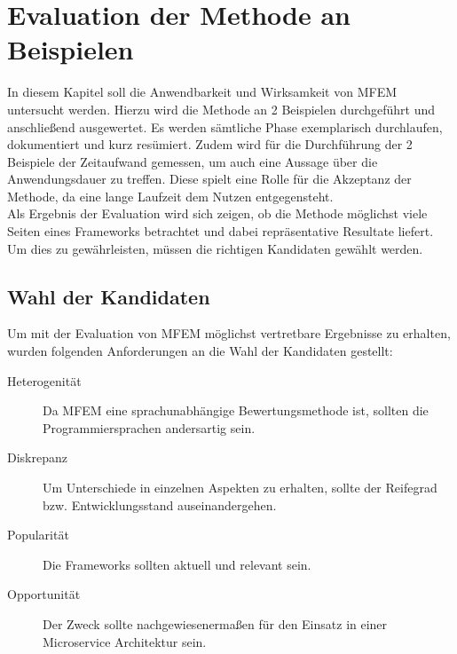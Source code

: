 \section{Evaluation der Methode an Beispielen}

In diesem Kapitel soll die Anwendbarkeit und Wirksamkeit von \ac{MFEM} untersucht werden. Hierzu wird die Methode an 2 Beispielen durchgeführt und anschließend ausgewertet. Es werden sämtliche Phase exemplarisch durchlaufen, dokumentiert und kurz resümiert. Zudem wird für die Durchführung der 2 Beispiele der Zeitaufwand gemessen, um auch eine Aussage über die Anwendungsdauer zu treffen. Diese spielt eine Rolle für die Akzeptanz der Methode, da eine lange Laufzeit dem Nutzen entgegensteht.\\ 
Als Ergebnis der Evaluation wird sich zeigen, ob die Methode möglichst viele Seiten eines Frameworks betrachtet und dabei repräsentative Resultate liefert.  
Um dies zu gewährleisten, müssen die richtigen Kandidaten gewählt werden.

\subsection{Wahl der Kandidaten}

Um mit der Evaluation von \ac{MFEM} möglichst vertretbare Ergebnisse zu erhalten, wurden folgenden Anforderungen an die Wahl der Kandidaten gestellt:

\begin{description}
	\item[Heterogenität] Da \ac{MFEM} eine sprachunabhängige Bewertungsmethode ist, sollten die Programmiersprachen andersartig sein.
	\item[Diskrepanz] Um Unterschiede in einzelnen Aspekten zu erhalten, sollte der Reifegrad bzw. Entwicklungsstand auseinandergehen.
	\item[Popularität] Die Frameworks sollten aktuell und relevant sein.
	\item[Opportunität] Der Zweck sollte nachgewiesenermaßen für den Einsatz in einer Microservice Architektur sein.
\end{description}


